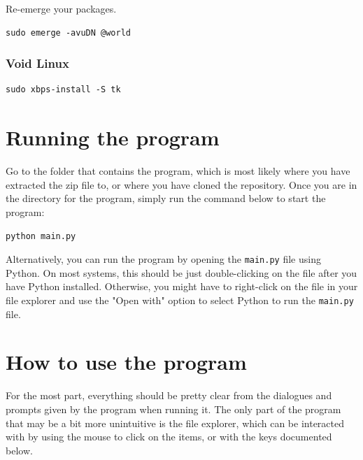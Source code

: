 \documentclass[11pt]{article}
\begin{document}
 \noindent Re-emerge your packages.
\begin{verbatim}
sudo emerge -avuDN @world
\end{verbatim}

\subsubsection{Void Linux}
\label{sec:org31a03ec}
\begin{verbatim}
sudo xbps-install -S tk
\end{verbatim}


\section{Running the program}
\label{sec:org23f3fe8}
Go to the folder that contains the program, which is most likely where you have extracted the zip file to, or where you have cloned the repository. Once you are in the directory for the program, simply run the command below to start the program:
\begin{verbatim}
python main.py
\end{verbatim}

Alternatively, you can run the program by opening the \texttt{main.py} file using Python. On most systems, this should be just double-clicking on the file after you have Python installed. Otherwise, you might have to right-click on the file in your file explorer and use the "Open with" option to select Python to run the \texttt{main.py} file.


\section{How to use the program}
\label{sec:org60de6bd}
For the most part, everything should be pretty clear from the dialogues and prompts given by the program when running it. The only part of the program that may be a bit more unintuitive is the file explorer, which can be interacted with by using the mouse to click on the items, or with the keys documented below.
\end{document}

